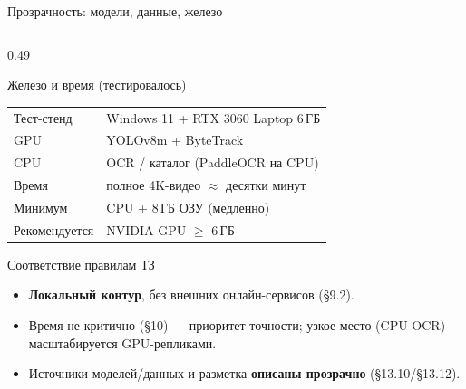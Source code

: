 \documentclass[aspectratio=169,10pt]{beamer}
\newcommand{\hl}[1]{{\bfseries\color{accent}#1}}
\newcommand{\hg}[1]{{\bfseries\color{good}#1}}
\begin{document}
\begin{frame}{Прозрачность: модели, данные, железо}
\begin{columns}[T,onlytextwidth]
\begin{column}{0.49\textwidth}
\begin{block}{Железо и время (тестировалось)}
\begin{tabular}{@{}p{2.5cm}p{5.4cm}@{}}
          Тест-стенд   & Windows 11 + RTX 3060 Laptop 6\,ГБ\\
          GPU          & YOLOv8m + ByteTrack\\
          CPU          & OCR / каталог (PaddleOCR на CPU)\\
          Время        & полное 4K-видео $\approx$ десятки минут\\
          Минимум      & CPU + 8\,ГБ ОЗУ (медленно)\\
          Рекомендуется& NVIDIA GPU $\geq$ 6\,ГБ\\ \bottomrule
        \end{tabular}
      \end{block}
      \vspace{0.35em}
      \begin{block}{Соответствие правилам ТЗ}\footnotesize
        \begin{itemize}\setlength\itemsep{1pt}
          \item \hg{Локальный контур}, без внешних онлайн-сервисов (§9.2).
          \item Время не критично (§10) — приоритет точности; узкое место (CPU-OCR) масштабируется GPU-репликами.
          \item Источники моделей/данных и разметка \hl{описаны прозрачно} (§13.10/§13.12).
        \end{itemize}
      \end{block}
    \end{column}
  \end{columns}
\end{frame}
\end{document}
